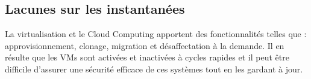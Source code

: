 
\subsection{Lacunes sur les instantanées}

La virtualisation et le Cloud Computing apportent des fonctionnalités telles que : approvisionnement, clonage, migration et désaffectation à la demande. Il en résulte que les VMs sont activées et inactivées à cycles rapides et il peut être difficile d'assurer une sécurité efficace de ces systèmes tout en les gardant à jour.

